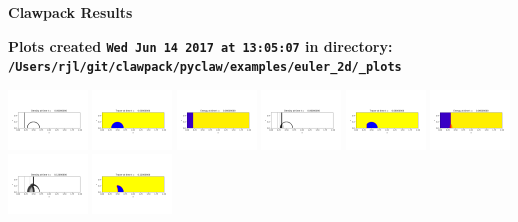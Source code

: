 \documentclass[11pt]{article}
\begin{document}
        \begin{center}{\Large\bf Clawpack Results}\vskip 5pt
        
        \bf Plots created {\tt Wed Jun 14 2017 at 13:05:07} in directory: \vskip 5pt
        \verb+/Users/rjl/git/clawpack/pyclaw/examples/euler_2d/_plots+
        \end{center}
        \vskip 5pt
        \includegraphics[width=0.158333333333\textwidth]{frame0000fig0.png}
\includegraphics[width=0.158333333333\textwidth]{frame0000fig1.png}
\includegraphics[width=0.158333333333\textwidth]{frame0000fig2.png}
\includegraphics[width=0.158333333333\textwidth]{frame0001fig0.png}
\includegraphics[width=0.158333333333\textwidth]{frame0001fig1.png}
\includegraphics[width=0.158333333333\textwidth]{frame0001fig2.png}
\vskip 10pt 
\includegraphics[width=0.158333333333\textwidth]{frame0002fig0.png}
\includegraphics[width=0.158333333333\textwidth]{frame0002fig1.png}
\end{document}
